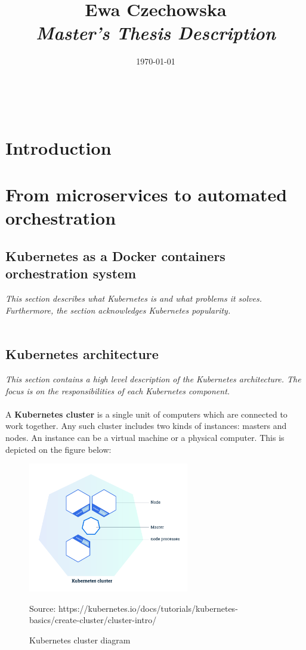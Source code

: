 \documentclass[12pt]{article}
\title{
{\small Ewa Czechowska } \\
\bf\textit{ Master’s Thesis Description } \\
\vspace{4cm}}
\date{\today}
\begin{document}
\maketitle
~\vspace{8cm}
\newpage

\section{Introduction}
\section{From microservices to automated orchestration}
\subsection{Kubernetes as a Docker containers orchestration system}
\textit{This section describes what Kubernetes is and what problems it solves. Furthermore, the section acknowledges Kubernetes popularity.}
~\\
~\\
\subsection{Kubernetes architecture}
\textit{This section contains a high level description of the Kubernetes architecture. The focus is on the responsibilities of each Kubernetes component.}
~\\
~\\
A \textbf{Kubernetes cluster} is a single unit of computers which are connected to work together. Any such cluster includes two kinds of instances: masters and nodes. An instance can be a virtual machine or a physical computer. This is depicted on the figure below\cite{k8s-cluster}:
\begin{figure}[H]
    \centering
    \includegraphics[width=7cm]{figures/cluster.png}
    \label{fig:cluster}
    \caption{Kubernetes cluster diagram}
    \small{Source: https://kubernetes.io/docs/tutorials/kubernetes-basics/create-cluster/cluster-intro/}
\end{figure}
\end{document}
